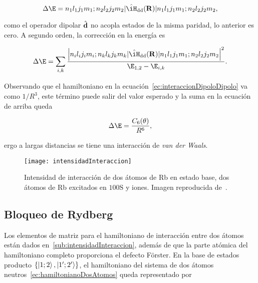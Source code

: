 \begin{equation}
\label{ec:perturbacionPrimerOrden}
\Delta\E=\braket*{n_\sm{1}l_\sm{1}j_\sm{1}m_\sm{1};n_\sm{2}l_\sm{2}j_\sm{2}m_\sm{2}|\hat{\iH}_\sm{\text{dd}}(\vektor{R})|n_\sm{1}l_\sm{1}j_\sm{1}m_\sm{1};n_\sm{2}l_\sm{2}j_\sm{2}m_\sm{2}},
\end{equation}

como el operador dipolar $\hat{\text{\textbf{d}}}$ no acopla estados de la misma paridad, lo anterior es cero. A segundo orden, la corrección en la energía es

\begin{equation}
\label{ec:perturbacionSegundoOrden}
\Delta\E=\sum_{i,k}\frac{\abs{\braket*{n_\sm{i}l_\sm{i}j_\sm{i}m_\sm{i};n_\sm{k}l_\sm{k}j_\sm{k}m_\sm{k}|\hat{\iH}_\sm{\text{dd}}(\vektor{R})|n_\sm{1}l_\sm{1}j_\sm{1}m_\sm{1};n_\sm{2}l_\sm{2}j_\sm{2}m_\sm{2}}}^{2}}{\E_\sm{1,2}-\E_\sm{i,k}}.
\end{equation}

Observando que el hamiltoniano en la ecuación~\ref{ec:interaccionDipoloDipolo} va como $1/R^{3}$, este término puede salir del valor esperado y la suma en la ecuación de arriba queda

\begin{equation}
\label{ec:fuerzavanderWaals}
\Delta\E=\frac{C_\sm{6}(\theta)}{R^{6}},
\end{equation}

ergo a largas distancias se tiene una interacción de \emph{van der Waals}.

\begin{figure}
\centering
\begin{minipage}{0.8\textwidth}
\centering
\texttt{[image: intensidadInteraccion]}
\caption{\label{fig:intensidadInteraccion}Intensidad de interacción de dos átomos de Rb en estado base, dos átomos de Rb excitados en $\text{100}\mathrm{S}$ y iones. Imagen reproducida de~\cite{saffman}.}
\end{minipage}
\end{figure}

\subsection{\label{sub:bloqueoRydberg}Bloqueo de Rydberg}

Los elementos de matriz para el hamiltoniano de interacción entre dos átomos están dados en~\ref{sub:intensidadInteraccion}, además de que la parte atómica del hamiltoniano completo proporciona el defecto Förster. En la base de estados producto $\{\ket{1;2},\ket{1';2'}\}$, el hamiltoniano del sistema de dos átomos neutros~\ref{ec:hamiltonianoDosAtomos} queda representado por

